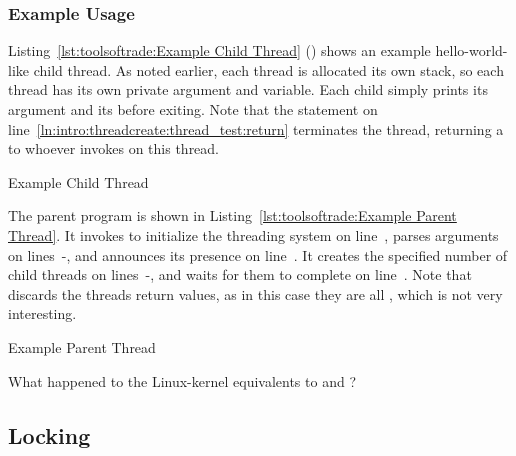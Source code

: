 \subsubsection{Example Usage}

Listing~\ref{lst:toolsoftrade:Example Child Thread} ()
shows an example hello-world-like child thread.
As noted earlier, each thread is allocated its own stack, so
each thread has its own private  argument and  variable.
Each child simply prints its argument and its 
before exiting.
Note that the  statement on
line~\ref{ln:intro:threadcreate:thread_test:return} terminates the thread,
returning a  to whoever invokes  on this
thread.

\begin{listing}[tbp]

\caption{Example Child Thread}
\label{lst:toolsoftrade:Example Child Thread}
\end{listing}

\begin{lineref}
The parent program is shown in
Listing~\ref{lst:toolsoftrade:Example Parent Thread}.
It invokes  to initialize the threading system on
line~,
parses arguments on lines~-,
and announces its presence on line~.
It creates the specified number of child threads on
lines~-,
and waits for them to complete on line~.
Note that  discards the threads return values,
as in this case they are all , which is not very interesting.
\end{lineref}

\begin{listing}[tbp]

\caption{Example Parent Thread}
\label{lst:toolsoftrade:Example Parent Thread}
\end{listing}

\QuickQuiz{}
	What happened to the Linux-kernel equivalents to 
	and ?
 \QuickQuizEnd

\subsection{Locking}
\label{sec:toolsoftrade:Locking}

